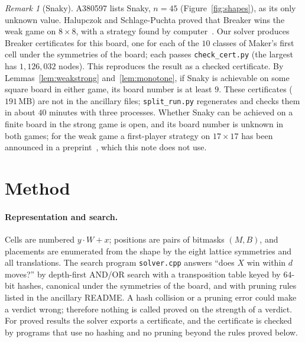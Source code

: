 \documentclass[11pt]{article}
\theoremstyle{definition}
\theoremstyle{remark}
\newtheorem{remark}[theorem]{Remark}
\newcommand{\file}[1]{\texttt{#1}}
\begin{document}
\begin{remark}[Snaky]\label{rem:snaky}
A380597 lists Snaky, $n=45$ (Figure~\ref{fig:shapes}), as its only unknown value. Halupczok and Schlage-Puchta proved that Breaker wins the weak game on $8\times 8$, with a strategy
found by computer~\cite[Theorem~1(3), Section~2]{HSP07}. Our solver produces Breaker certificates
for this board, one for each of the $10$ classes of Maker's first cell under the symmetries of the
board; each passes \file{check\_cert.py} (the largest has $1{,}126{,}032$ nodes). This reproduces
the result as a checked certificate. By Lemmas~\ref{lem:weakstrong} and~\ref{lem:monotone}, if Snaky
is achievable on some square board in either game, its board number is at least $9$. These
certificates ($191$\,MB) are not in the ancillary files; \file{split\_run.py} regenerates and checks
them in about $40$ minutes with three processes. Whether Snaky can be achieved on a finite board in
the strong game is open, and its board number is unknown in both games; for the weak game a
first-player strategy on $17\times 17$ has been announced in a preprint~\cite{OAI26}, which this
note does not use.
\end{remark}

\section{Method}\label{sec:method}

\paragraph{Representation and search.} Cells are numbered $y\cdot W+x$; positions are pairs of
bitmasks $(M,B)$, and placements are enumerated from the shape by the eight lattice symmetries and
all translations. The search program \file{solver.cpp} answers ``does $X$ win within $d$ moves?''
by depth-first AND/OR search with a transposition table keyed by $64$-bit hashes, canonical under
the symmetries of the board, and with pruning rules listed in the ancillary README. A hash collision
or a pruning error could make a verdict wrong; therefore nothing is called proved on the strength of
a verdict. For proved results the solver exports a certificate, and the certificate is checked by
programs that use no hashing and no pruning beyond the rules proved below.
\end{document}
